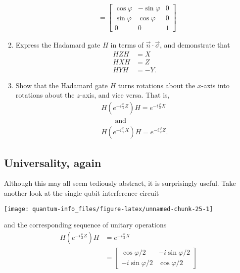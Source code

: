 \documentclass[fleqn]{article}
\begin{document}
\begin{enumerate}
\[\begin{aligned}
     \\&= \begin{bmatrix}
         \cos \varphi & -\sin \varphi & 0
       \\\sin \varphi & \cos \varphi & 0
       \\0 & 0 & 1
       \end{bmatrix}
     \end{aligned}
   \]
\item
  Express the Hadamard gate \(H\) in terms of \(\vec{n}\cdot\vec{\sigma}\), and demonstrate that
  \[
     \begin{aligned}
       HZH&=X
     \\HXH&=Z
     \\HYH&=-Y.
     \end{aligned}
   \]
\item
  Show that the Hadamard gate \(H\) turns rotations about the \(x\)-axis into rotations about the \(z\)-axis, and vice versa.
  That is,
  \[
     \begin{gathered}
       H \left(
         e^{-i\frac{\varphi}{2}Z}
       \right) H
       = e^{-i\frac{\varphi}{2}X}
     \\\qquad \text{and} \qquad
     \\H \left(
         e^{-i\frac{\varphi}{2}X}
       \right) H
       = e^{-i\frac{\varphi}{2}Z}.
     \end{gathered}
   \]
\end{enumerate}

\hypertarget{universality-again}{%
\subsection{Universality, again}\label{universality-again}}

Although this may all seem tediously abstract, it is surprisingly useful.
Take another look at the single qubit interference circuit

\begin{center}\texttt{[image: quantum-info\_files/figure-latex/unnamed-chunk-25-1]} \end{center}

and the corresponding sequence of unitary operations
\[
  \begin{aligned}
    H \left(
      e^{-i\frac{\varphi}{2}Z}
    \right) H
    &= e^{-i\frac{\varphi}{2}X}
  \\&= \begin{bmatrix}
      \cos\varphi/2 & -i\sin\varphi/2
    \\-i\sin\varphi/2 & \cos\varphi/2
    \end{bmatrix}
  \end{aligned}
\]
\end{document}
